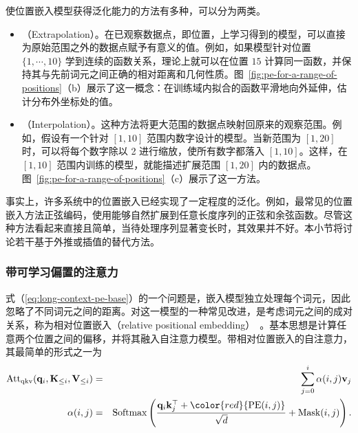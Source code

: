使位置嵌入模型获得泛化能力的方法有多种，可以分为两类。

\begin{itemize}
\item \vspace{0.5em} （Extrapolation）。在已观察数据点，即位置，上学习得到的模型，可以直接为原始范围之外的数据点赋予有意义的值。例如，如果模型针对位置 $\{1, \cdots, 10\}$ 学到连续的函数关系，理论上就可以在位置 $15$ 计算同一函数，并保持其与先前词元之间正确的相对距离和几何性质。图~\ref{fig:pe-for-a-range-of-positions}（b）展示了这一概念：在训练域内拟合的函数平滑地向外延伸，估计分布外坐标处的值。
\item \vspace{0.3em} （Interpolation）。这种方法将更大范围的数据点映射回原来的观察范围。例如，假设有一个针对 $[1,10]$ 范围内数字设计的模型。当新范围为 $[1,20]$ 时，可以将每个数字除以 2 进行缩放，使所有数字都落入 $[1,10]$。这样，在 $[1,10]$ 范围内训练的模型，就能描述扩展范围 $[1,20]$ 内的数据点。图~\ref{fig:pe-for-a-range-of-positions}（c）展示了这一方法。
\end{itemize}
\vspace{0.5em}

事实上，许多系统中的位置嵌入已经实现了一定程度的泛化。例如，最常见的位置嵌入方法正弦编码，使用能够自然扩展到任意长度序列的正弦和余弦函数。尽管这种方法看起来直接且简单，当待处理序列显著变长时，其效果并不好。本小节将讨论若干基于外推或插值的替代方法。

\subsubsection{带可学习偏置的注意力}

\noindent 式（\ref{eq:long-context-pe-base}）的一个问题是，嵌入模型独立处理每个词元，因此忽略了不同词元之间的距离。对这一模型的一种常见改进，是考虑词元之间的成对关系，称为相对位置嵌入（relative positional embedding）~\cite{shaw-etal:2018self}。基本思想是计算任意两个位置之间的偏移，并将其融入自注意力模型。带相对位置嵌入的自注意力，其最简单的形式之一为
\begin{eqnarray}
\mathrm{Att}_{\mathrm{qkv}}(\mathbf{q}_i,\mathbf{K}_{\le i},\mathbf{V}_{\le i}) & = & \sum_{j=0}^{i} \alpha(i,j) \mathbf{v}_j \\
\alpha(i,j) & = & \mathrm{Softmax} \left(\frac{\mathbf{q}_i \mathbf{k}_{j}^\top + \color{red}{\mathrm{PE}(i,j)}}{\sqrt{d}} + \mathrm{Mask}(i,j) \right). \label{eq:attention-weight-base-T5}
\end{eqnarray}

